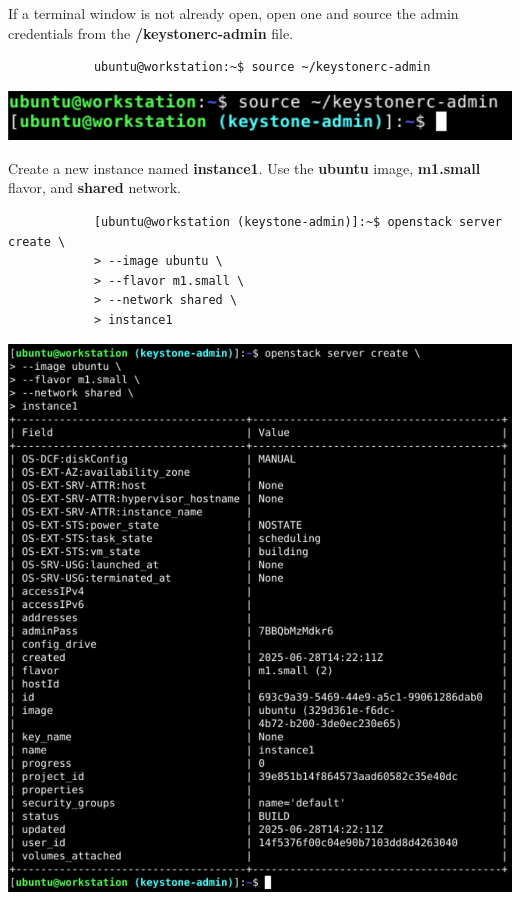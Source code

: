 \documentclass[letterpaper, 12pt]{article}
\begin{document}
\begin{enumerate}
    \begin{labstep}
        If a terminal window is not already open, open one and source the admin credentials from the \textbf{\texttildemid/keystonerc-admin} file.
        \begin{lstlisting}
            ubuntu@workstation:~$ source ~/keystonerc-admin
        \end{lstlisting}

        \begin{center}
            \includegraphics[width=\linewidth]{images/part3/step1.png}
        \end{center}
    \end{labstep}

    \begin{labstep}
        Create a new instance named \textbf{instance1}.
        Use the \textbf{ubuntu} image, \textbf{m1.small} flavor, and \textbf{shared} network.
        \begin{lstlisting}
            [ubuntu@workstation (keystone-admin)]:~$ openstack server create \
            > --image ubuntu \
            > --flavor m1.small \
            > --network shared \
            > instance1
        \end{lstlisting}

        \begin{center}
            \includegraphics[width=\linewidth]{images/part3/step2.png}
        \end{center}
    \end{labstep}


\end{enumerate}
\end{document}

